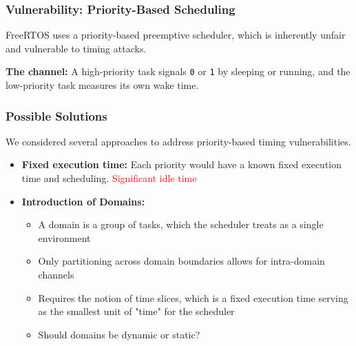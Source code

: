 \begin{frame}
\frametitle{Vulnerability: Priority-Based Scheduling}

FreeRTOS uses a priority-based preemptive scheduler, which is inherently unfair and vulnerable to timing attacks.

\vspace{0.3cm}
\begin{center}
\resizebox{0.70\textwidth}{!}{}
\end{center}

\vspace{0.3cm}
\textbf{The channel:} A high-priority task signals \texttt{0} or \texttt{1} by
sleeping or running, and the low-priority task measures its own wake time.

\vspace{0.2cm}
\tiny{}

\end{frame}

\begin{frame}
\frametitle{Possible Solutions}
We considered several approaches to address priority-based timing vulnerabilities.

\begin{itemize}
  \item \textbf{Fixed execution time:} Each priority would have a known fixed execution time and scheduling. \textcolor{red}{Significant idle time}
  \item \textbf{Introduction of Domains:}
    \begin{itemize}
      \item A domain is a group of tasks, which the scheduler treats as a
        single environment
      \item Only partitioning across domain boundaries allows for intra-domain
        channels
      \item Requires the notion of time slices, which is a fixed execution time
        serving as the smallest unit of "time" for the scheduler
      \item Should domains be dynamic or static?
    \end{itemize}
\end{itemize}

\end{frame}

